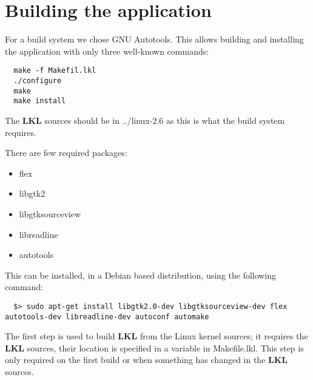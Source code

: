 \chapter{Building the application}

For a build system we chose GNU Autotools. This allows building
and installing the application with only three well-known commands:

\lstset{language=bash,caption=Build System,label=lst:building}
\begin{lstlisting}
  make -f Makefil.lkl
  ./configure
  make
  make install
\end{lstlisting}

The \textbf{LKL} sources should be in ../linux-2.6 as this is
what the build system requires.

There are few required packages:
\begin{itemize}
  \item flex
  \item libgtk2
  \item libgtksourceview
  \item libreadline
  \item autotools
\end{itemize}

This can be installed, in a Debian based distribution, using the following 
command:
\lstset{language=zsh,caption=Required packages,label=lst:bpacakges}
\begin{lstlisting}
  $> sudo apt-get install libgtk2.0-dev libgtksourceview-dev flex autotools-dev libreadline-dev autoconf automake
\end{lstlisting}

The first step is used to build \textbf{LKL} from the Linux kernel sources; it
requires the \textbf{LKL} sources, their location is specified in a variable in
Makefile.lkl. This step is only required on the first build or
when something has changed in the \textbf{LKL} sources.
